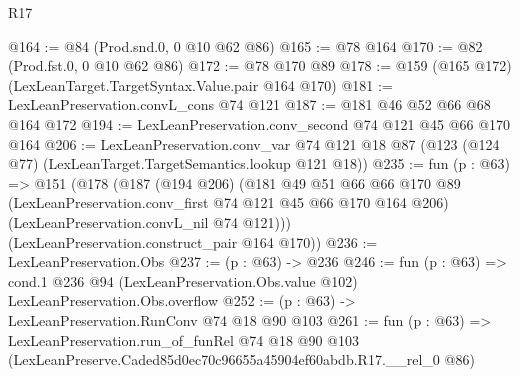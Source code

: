 \begin{lexlean}{R17}
\begin{coremodule}
@164 := @84 (Prod.snd.{0, 0} @10 @62 @86)
@165 := @78 @164
@170 := @82 (Prod.fst.{0, 0} @10 @62 @86)
@172 := @78 @170 @89
@178 := @159 (@165 @172) (LexLeanTarget.TargetSyntax.Value.pair @164 @170)
@181 := LexLeanPreservation.convL_cons @74 @121
@187 := @181 @46 @52 @66 @68 @164 @172
@194 := LexLeanPreservation.conv_second @74 @121 @45 @66 @170 @164
@206 := LexLeanPreservation.conv_var
    @74
    @121
    @18
    @87
    (@123 (@124 @77) (LexLeanTarget.TargetSemantics.lookup @121 @18))
@235 := fun (p : @63) =>
  @151
    (@178
      (@187
        (@194 @206)
        (@181
          @49
          @51
          @66
          @66
          @170
          @89
          (LexLeanPreservation.conv_first @74 @121 @45 @66 @170 @164 @206)
          (LexLeanPreservation.convL_nil @74 @121)))
      (LexLeanPreservation.construct_pair @164 @170))
@236 := LexLeanPreservation.Obs
@237 := (p : @63) -> @236
@246 := fun (p : @63) =>
  cond.{1} @236 @94 (LexLeanPreservation.Obs.value @102) LexLeanPreservation.Obs.overflow
@252 := (p : @63) -> LexLeanPreservation.RunConv @74 @18 @90 @103
@261 := fun (p : @63) =>
  LexLeanPreservation.run_of_funRel
    @74
    @18
    @90
    @103
    (LexLeanPreserve.Caded85d0ec70c96655a45904ef60abdb.R17.__rel_0 @86)
\end{coremodule}
\end{lexlean}
